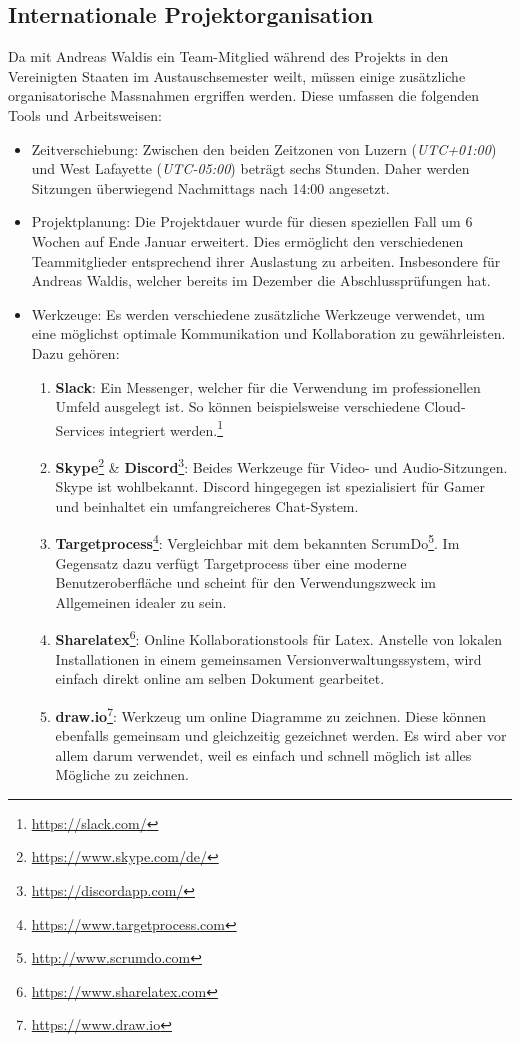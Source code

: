 \subsection{Internationale Projektorganisation}
\label{subsec:international}
Da mit Andreas Waldis ein Team-Mitglied während des Projekts in den Vereinigten Staaten im Austauschsemester weilt, müssen einige zusätzliche organisatorische Massnahmen ergriffen werden. Diese umfassen die folgenden Tools und Arbeitsweisen:
\begin{itemize}
\item Zeitverschiebung: Zwischen den beiden Zeitzonen von Luzern (\textit{UTC+01:00}) und West Lafayette (\textit{UTC-05:00}) beträgt sechs Stunden. Daher werden Sitzungen überwiegend Nachmittags nach 14:00 angesetzt. 
\item Projektplanung: Die Projektdauer wurde für diesen speziellen Fall um 6 Wochen auf Ende Januar erweitert. Dies ermöglicht den verschiedenen Teammitglieder entsprechend ihrer Auslastung zu arbeiten. Insbesondere für Andreas Waldis, welcher bereits im Dezember die Abschlussprüfungen hat. 
\item Werkzeuge: Es werden verschiedene zusätzliche Werkzeuge verwendet, um eine möglichst optimale Kommunikation und Kollaboration zu gewährleisten. Dazu gehören:
\begin{enumerate}
\item \textbf{Slack}: Ein Messenger, welcher für die Verwendung im professionellen Umfeld ausgelegt ist. So können beispielsweise verschiedene Cloud-Services integriert werden.\footnote{\url{https://slack.com/}}
\item \textbf{Skype}\footnote{\url{https://www.skype.com/de/}} \& \textbf{Discord}\footnote{\url{https://discordapp.com/}}: Beides Werkzeuge für Video- und Audio-Sitzungen. Skype ist wohlbekannt. Discord hingegegen ist spezialisiert für Gamer und beinhaltet ein umfangreicheres Chat-System.
\item \textbf{Targetprocess}\footnote{\url{https://www.targetprocess.com}}: Vergleichbar mit dem bekannten ScrumDo\footnote{\url{http://www.scrumdo.com}}. Im Gegensatz dazu verfügt Targetprocess über eine moderne Benutzeroberfläche und scheint für den Verwendungszweck im Allgemeinen idealer zu sein.
\item \textbf{Sharelatex}\footnote{\url{https://www.sharelatex.com}}: Online Kollaborationstools für Latex. Anstelle von lokalen Installationen in einem gemeinsamen Versionverwaltungssystem, wird einfach direkt online am selben Dokument gearbeitet.
\item \textbf{draw.io}\footnote{\url{https://www.draw.io}}: Werkzeug um online Diagramme zu zeichnen. Diese können ebenfalls gemeinsam und gleichzeitig gezeichnet werden. Es wird aber vor allem darum verwendet, weil es einfach und schnell möglich ist alles Mögliche zu zeichnen.
\end{enumerate}
\end{itemize}

